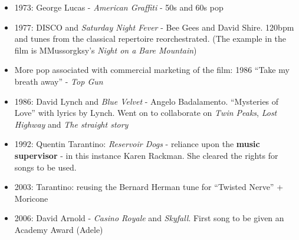 \begin{itemize}
\item 1973: George Lucas - \textit{American Graffiti} - 50s and 60s pop
\item 1977: DISCO and \textit{Saturday Night Fever} - Bee Gees and David Shire. 120bpm and tunes from the classical repertoire reorchestrated. (The example in the film is MMussorgksy's \textit{Night on a Bare Mountain})
\item More pop associated with commercial marketing of the film: 1986 ``Take my breath away'' - \textit{Top Gun}
\item 1986: David Lynch and \textit{Blue Velvet} - Angelo Badalamento. ``Mysteries of Love'' with lyrics by Lynch. Went on to collaborate on \textit{Twin Peaks}, \textit{Lost Highway} and \textit{The straight story}
\item 1992: Quentin Tarantino: \textit{Reservoir Dogs} - reliance upon the \textbf{music supervisor} - in this instance Karen Rackman. She cleared the rights for songs to be used.
\item 2003: Tarantino: reusing the Bernard Herman tune for ``Twisted Nerve'' + Moricone
\item 2006: David Arnold - \textit{Casino Royale} and \textit{Skyfall}. First song to be given an Academy Award (Adele)
 
\end{itemize}

